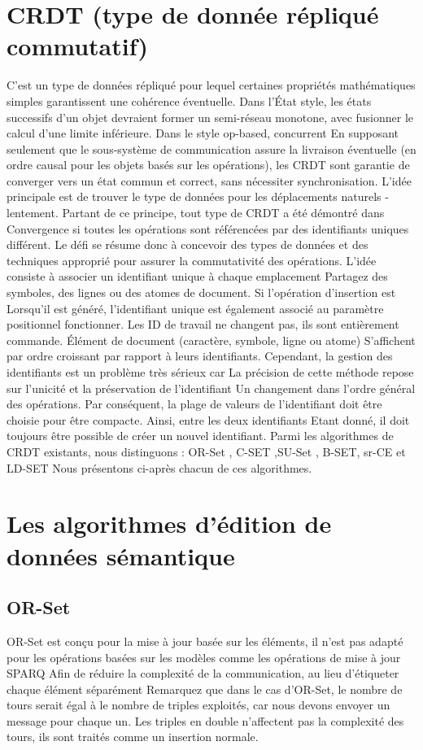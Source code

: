 \documentclass[12pt]{report}
\begin{document}
\section{CRDT (type de donnée répliqué commutatif)}
C'est un type de données répliqué pour lequel certaines propriétés mathématiques simples garantissent une cohérence éventuelle. Dans l’État style, les états successifs d’un objet devraient former un semi-réseau monotone, avec fusionner le calcul d’une limite inférieure. Dans le style op-based, concurrent En supposant seulement que le sous-système de communication assure la livraison éventuelle (en ordre causal pour les objets basés sur les opérations), les CRDT sont garantie de converger vers un état commun et correct, sans nécessiter synchronisation. 
L'idée principale est de trouver le type de données pour les déplacements naturels -
lentement. Partant de ce principe, tout type de CRDT a été démontré dans 
Convergence si toutes les opérations sont référencées par des identifiants uniques
différent. Le défi se résume donc à concevoir des types de données et des techniques
approprié pour assurer la commutativité des opérations.
L'idée consiste à associer un identifiant unique à chaque emplacement
Partagez des symboles, des lignes ou des atomes de document. Si l'opération d'insertion est
Lorsqu'il est généré, l'identifiant unique est également associé au paramètre positionnel
fonctionner. Les ID de travail ne changent pas, ils sont entièrement
commande. Élément de document (caractère, symbole, ligne ou atome)
S'affichent par ordre croissant par rapport à leurs identifiants.
Cependant, la gestion des identifiants est un problème très sérieux car La précision de cette méthode repose sur l'unicité et la préservation de l'identifiant Un changement dans l'ordre général des opérations. Par conséquent, la plage de valeurs de l'identifiant doit être choisie pour être compacte. Ainsi, entre les deux identifiants Etant donné, il doit toujours être possible de créer un nouvel identifiant. 
Parmi les algorithmes de CRDT existants, nous distinguons : OR-Set , C-SET ,SU-Set , B-SET, sr-CE et LD-SET Nous présentons ci-après chacun de ces algorithmes.
\section{Les algorithmes d'édition de données sémantique}
\subsection{OR-Set}
OR-Set est conçu pour la mise à jour basée sur les éléments, il n’est pas adapté pour les opérations basées sur les modèles comme les opérations de mise à jour SPARQ  Afin de réduire la complexité de la communication, au lieu d’étiqueter chaque élément séparément Remarquez que dans le cas d’OR-Set, le nombre de tours serait égal à le nombre de triples exploités, car nous devons envoyer un message pour chaque un. Les triples en double n’affectent pas la complexité des tours, ils sont traités comme un insertion normale.
\end{document}
